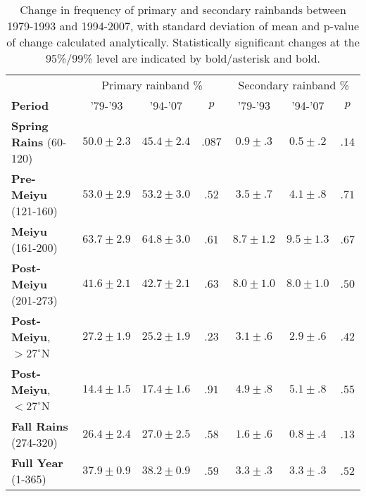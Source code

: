 \documentclass[draft,grl]{agutexSI}
\begin{document}
\begin{table}

\centering

\caption{Change in frequency of primary and secondary rainbands between 1979-1993 and 1994-2007, with standard deviation of mean and p-value of change calculated analytically. Statistically significant changes at the 95\%/99\% level are indicated by bold/asterisk and bold.}

\begin{tabular}{ l c c c c c c}
	& \multicolumn{3}{c}{Primary rainband \%} & \multicolumn{3}{c}{Secondary rainband \%} \\
	\textbf{Period} & '79-'93 & '94-'07 & $p$ & '79-'93 & '94-'07 & $p$ \\
	\hline	
	\textbf{Spring Rains} (60-120)		& $50.0 \pm 2.3$ & $45.4 \pm 2.4$ & $ .087 $ 	& $0.9 \pm .3$ 	& $0.5 \pm .2$ & $.14$ \\
	\textbf{Pre-Meiyu} (121-160) 		& $53.0 \pm 2.9$ & $53.2 \pm 3.0$ & $ .52$ 	& $3.5 \pm .7$ 	& $4.1 \pm .8$ & $.71$ \\
	\textbf{Meiyu} (161-200)			& $63.7 \pm 2.9$ & $64.8 \pm 3.0$ & $ .61 $ 	& $8.7 \pm 1.2$ 	& $9.5 \pm 1.3$  & $.67$ \\
	\textbf{Post-Meiyu} (201-273)		& $41.6 \pm 2.1$ & $42.7 \pm 2.1$ & $ .63 $	& $8.0 \pm 1.0$ 	& $8.0 \pm 1.0$ & $.50$ \\
	\textbf{Post-Meiyu}, $>27^\circ$N 	& $27.2 \pm 1.9$ & $25.2 \pm 1.9$ & $ .23 $ 	& $3.1 \pm .6$ 	& $2.9 \pm .6$ & $.42$ \\
	\textbf{Post-Meiyu}, $<27^\circ$N 	& $14.4 \pm 1.5 $ & $17.4 \pm 1.6$ & $ .91 $ 	& $4.9 \pm .8$ 	& $5.1 \pm .8$ & $.55$  \\
	\textbf{Fall Rains} (274-320)			& $26.4 \pm 2.4 $ & $27.0 \pm 2.5$ & $ .58 $ 	& $1.6 \pm .6$ 	& $0.8 \pm .4$ & $.13$ \\
	\textbf{Full Year} (1-365)			& $37.9 \pm 0.9 $ & $38.2 \pm 0.9$ & $ .59 $ 	& $3.3 \pm .3$ 	& $3.3 \pm .3$ & $.52$ \\

\end{tabular}
\label{ts7}
\end{table}
\end{document}
